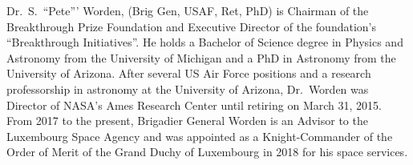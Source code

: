 \documentclass[a4paper,parskip,10pt]{scrartcl}
\begin{document}
\begin{tcolorbox}
        {
            \small
            \color{white!20!black}
            Dr.~S.~``Pete''' Worden, (Brig Gen, USAF, Ret, PhD) is Chairman of the Breakthrough Prize Foundation and Executive Director of the foundation's ``Breakthrough Initiatives''. He holds a Bachelor of Science degree in Physics and Astronomy from the University of Michigan and a PhD in Astronomy from the University of Arizona. After several US Air Force positions and a research professorship in astronomy at the University of Arizona, Dr.~Worden was Director of NASA's Ames Research Center until retiring on March 31, 2015. From 2017 to the present, Brigadier General Worden is an Advisor to the Luxembourg Space Agency and was appointed as a Knight-Commander of the Order of Merit of the Grand Duchy of Luxembourg in 2018 for his space services.}

        

        \vspace{2ex}
    \end{tcolorbox}
    \vspace{-1ex}

    \vfill
\end{document}
